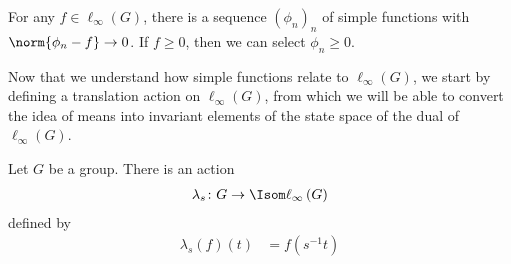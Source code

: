 \begin{corollary}
  For any $f\in \ell_{\infty}\left(G\right)$, there is a sequence $\left(\phi_n\right)_n$ of simple functions with $\norm{\phi_n -f}\rightarrow 0$. If $f\geq 0$, then we can select $\phi_n\geq 0$.
\end{corollary}
Now that we understand how simple functions relate to $\ell_{\infty}(G)$, we start by defining a translation action on $\ell_{\infty}(G)$, from which we will be able to convert the idea of means into invariant elements of the state space of the dual of $\ell_{\infty}\left(G\right)$.
\begin{proposition}\label{prop:translation_action}
  Let $G$ be a group. There is an action
  \begin{align*}
    \lambda_s\colon G\rightarrow \Isom\ell_{\infty}\left(G\right)
  \end{align*}
  defined by
  \begin{align*}
    \lambda_{s}\left(f\right)\left(t\right) &= f\left(s^{-1}t\right)
  \end{align*}
\end{proposition}
